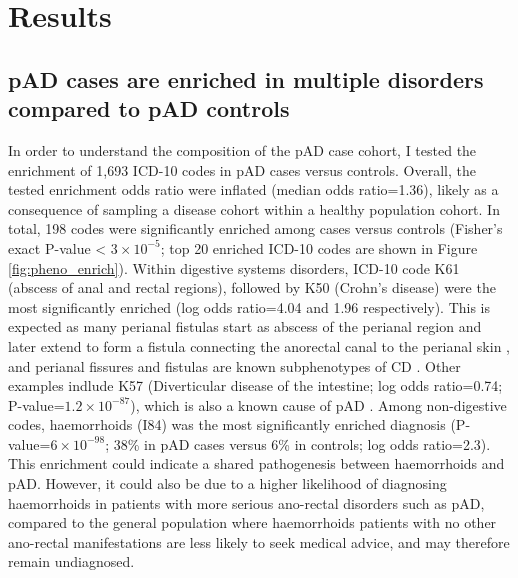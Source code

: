 \section{Results}



  \subsection{pAD cases are enriched in multiple disorders compared to pAD controls}\label{section:pheno_enrich}


  In order to understand the composition of the pAD case cohort, I tested the enrichment of 1,693 ICD-10 codes in pAD cases versus controls. Overall, the tested enrichment odds ratio were inflated (median odds ratio=1.36), likely as a consequence of sampling a disease cohort within a healthy population cohort. In total, 198 codes were significantly enriched among cases versus controls (Fisher's exact  P-value < $3\times10^{-5}$; top 20 enriched ICD-10 codes are shown in Figure \ref{fig:pheno_enrich}).  Within digestive systems disorders, ICD-10 code K61 (abscess of anal and rectal regions), followed by K50 (Crohn's disease) were the most significantly enriched (log odds ratio=4.04 and 1.96 respectively). This is expected as many perianal fistulas start as abscess of the perianal region and later extend to form a fistula connecting the anorectal canal to the perianal skin \cite{abscess_fist}, and perianal fissures and fistulas are known subphenotypes of CD \cite{Marzo2015-wf}. Other examples indlude K57 (Diverticular disease of the intestine; log odds ratio=0.74; P-value=$1.2\times10^{-87}$), which is also a known cause of pAD \cite{div_pad}. Among non-digestive codes, haemorrhoids (I84) was the most significantly enriched diagnosis (P-value=$6\times10^{-98}$; 38\% in pAD cases versus 6\% in controls; log odds ratio=2.3). This enrichment could indicate a shared pathogenesis between haemorrhoids and pAD. However, it could also be due to a higher likelihood of diagnosing haemorrhoids in patients with more serious ano-rectal disorders such as pAD, compared to the general population where haemorrhoids patients with no other ano-rectal manifestations are less likely to seek medical advice, and may therefore remain undiagnosed. \\

